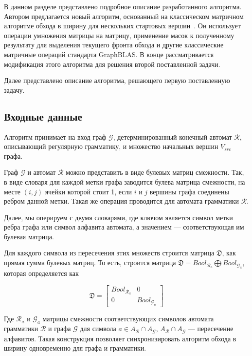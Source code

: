 
В данном разделе представлено подробное описание разработанного алгоритма. Автором предлагается новый алгоритм, основанный на классическом матричном алгоритме обхода в ширину для нескольких стартовых вершин~\cite{method_msbfs}.
Он использует операции умножения матрицы на матрицу, применение масок к полученному результату для выделения текущего фронта обхода и другие классические матричные операций стандарта GraphBLAS. В конце рассматривается модификация этого алгоритма для решения второй поставленной задачи.

Далее представлено описание алгоритма, решающего первую поставленную задачу.

\subsection{Входные данные}
    
Алгоритм принимает на вход граф $\mathcal{G}$, детерминированный конечный автомат $\mathcal{R}$, описывающий регулярную грамматику, и множество начальных вершин $V_{src}$ графа.

Граф $\mathcal{G}$ и автомат $\mathcal{R}$ можно представить в виде булевых матриц смежности. Так, в виде словаря для каждой метки графа заводится булева матрица смежности, на месте $(i, j)$ ячейки которой стоит 1, если $i$ и $j$ вершины графа соединены ребром данной метки. Такая же операция проводится для автомата грамматики $\mathcal{R}$.

Далее, мы оперируем с двумя словарями, где ключом является символ метки ребра графа или символ алфавита автомата, а значением --- соответствующая им булевая матрица.

Для каждого символа из пересечения этих множеств строится матрица $\mathfrak{D}$, как прямая сумма булевых матриц. То есть, строится матрица $\mathfrak{D} = Bool_{\mathcal{R}_a} \bigoplus Bool_{\mathcal{G}_a}$, которая определяется как

\begin{equation}
\mathfrak{D} = 
  \left[
    \begin{matrix}
        Bool_{\mathcal{R}_a} & 0\\
        0 & Bool_{\mathcal{G}_a}
    \end{matrix}
  \right]
\end{equation}

Где $\mathcal{R}_{a}$ и $\mathcal{G}_{a}$ матрицы смежности соответствующих символов автомата грамматики $\mathcal{R}$ и графа $\mathcal{G}$ для символа $a \in A_\mathcal{R} \cap A_\mathcal{G}$, $A_\mathcal{R} \cap A_\mathcal{G}$ --- пересечение алфавитов. Такая конструкция позволяет синхронизировать алгоритм обхода в ширину одновременно для графа и грамматики.

